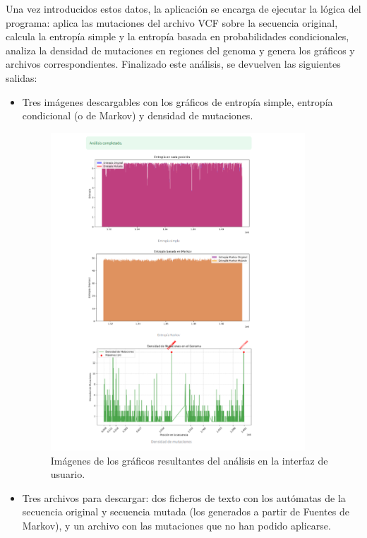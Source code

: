 \documentclass[11pt,spanish,listoffigures,listoftables]{tfgetsinf}
\begin{document}
Una vez introducidos estos datos, la aplicación se encarga de ejecutar la lógica del programa: aplica las mutaciones del archivo VCF sobre la secuencia original, calcula la entropía simple y la entropía basada en probabilidades condicionales, analiza la densidad de mutaciones en regiones del genoma y genera los gráficos y archivos correspondientes. Finalizado este análisis, se devuelven las siguientes salidas:  

\begin{itemize}
   \item Tres imágenes descargables con los gráficos de entropía simple, entropía condicional (o de Markov) y densidad de mutaciones. 
   \begin{figure}[H]
      \centering
      \includegraphics[width=0.9\textwidth]{Graficos_RP.png}
      \caption{Imágenes de los gráficos resultantes del análisis en la interfaz de usuario.}
      \label{fig:etiqueta_opcional9}
   \end{figure}
   \item Tres archivos para descargar: dos ficheros de texto con los autómatas de la secuencia original y secuencia mutada (los generados a partir de Fuentes de Markov), y un archivo con las mutaciones que no han podido aplicarse. 

\end{itemize}
\end{document}
